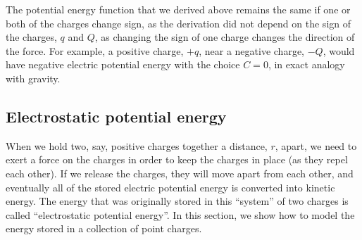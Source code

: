 The potential energy function that we derived above remains the same if one or both of the charges change sign, as the derivation did not depend on the sign of the charges, $q$ and $Q$, as changing the sign of one charge changes the direction of the force. For example, a positive charge, $+q$, near a negative charge, $-Q$, would have negative electric potential energy with the choice $C=0$, in exact analogy with gravity.

\subsection{Electrostatic potential energy}
When we hold two, say, positive charges together a distance, $r$, apart, we need to exert a force on the charges in order to keep the charges in place (as they repel each other). If we release the charges, they will move apart from each other, and eventually all of the stored electric potential energy is converted into kinetic energy. The energy that was originally stored in this ``system'' of two charges is called ``electrostatic potential energy''. In this section, we show how to model the energy stored in a collection of point charges.

